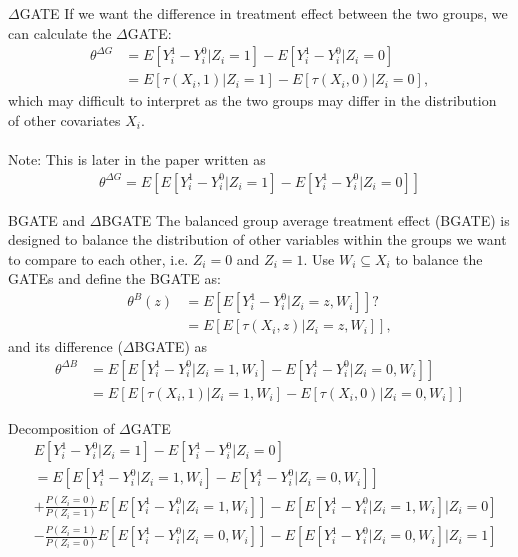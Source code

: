 \documentclass{beamer}\usepackage{listings}
\begin{document}
\begin{frame}[label={sec:org580e43c}]{\(\Delta\)GATE}
If we want the difference in treatment effect between the two groups, we can calculate the \(\Delta\)GATE:
\begin{align*}
\theta^{\Delta G} &= E[Y^1_i-Y^0_i\vert Z_i = 1]-E[Y^1_i-Y^0_i\vert Z_i = 0] \\
&= E[\tau(X_i,1)\vert Z_i = 1]-E[\tau(X_i,0)\vert Z_i = 0],
\end{align*}
which may difficult to interpret as the two groups may differ in the distribution of other covariates \(X_i\).\pause\\[0pt]
\\[0pt]
Note: This is later in the paper written as
\begin{align*}
\theta^{\Delta G} = E[E[Y^1_i-Y^0_i\vert Z_i = 1]-E[Y^1_i-Y^0_i\vert Z_i = 0]]
\end{align*}
\end{frame}


\begin{frame}[label={sec:orgf8cf0c4}]{BGATE and \(\Delta\)BGATE}
The balanced group average treatment effect (BGATE) is designed to balance the distribution of other variables within the groups we want to compare to each other, i.e. \(Z_i = 0\) and \(Z_i = 1\). Use \(W_i\subseteq X_i\) to balance the GATEs and define the BGATE as:
\begin{align*}
\theta^B(z) &= E[E[Y^1_i-Y^0_i\vert Z_i = z,W_i]]?\\
& = E[E[\tau(X_i,z)\vert Z_i = z,W_i]],
\end{align*}
\pause
and its difference (\(\Delta\)BGATE) as
\begin{align*}
\theta^{\Delta B} &= E[E[Y^1_i-Y^0_i\vert Z_i = 1,W_i]-E[Y^1_i-Y^0_i\vert Z_i = 0,W_i]]\\
& = E[E[\tau(X_i,1)\vert Z_i = 1,W_i]-E[\tau(X_i,0)\vert Z_i = 0,W_i]]
\end{align*}
\end{frame}



\begin{frame}[label={sec:org5d38512}]{Decomposition of \(\Delta\)GATE}
\begin{align*}
&E[Y^1_i-Y^0_i\vert Z_i = 1]-E[Y^1_i-Y^0_i\vert Z_i = 0]\\
& = E[E[Y^1_i-Y^0_i\vert Z_i = 1,W_i]-E[Y^1_i-Y^0_i\vert Z_i = 0,W_i]]\\
& + \frac{P(Z_i = 0)}{P(Z_i = 1)}E[E[Y^1_i-Y^0_i\vert Z_i = 1,W_i]]-E[E[Y^1_i-Y^0_i\vert Z_i = 1,W_i]\vert Z_i = 0]\\
& -\frac{P(Z_i = 1)}{P(Z_i = 0)}E[E[Y^1_i-Y^0_i\vert Z_i = 0,W_i]]-E[E[Y^1_i-Y^0_i\vert Z_i = 0,W_i]\vert Z_i = 1]
\end{align*}
\end{frame}
\end{document}
